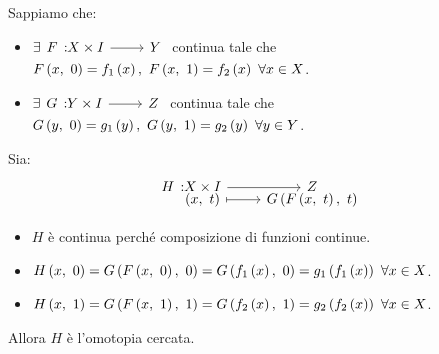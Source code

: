 \begin{demonstration}
	Sappiamo che:
	\begin{itemize}
		\item $\exists \funz{F}{X\times I}{Y}$ continua tale che $\mvf{F}{x}{0}=f_1\left(x\right),\ \mvf{F}{x}{1}=f_2\left(x\right)\ \forall x\in X$.
		\item $\exists \funz{G}{Y\times I}{Z}$ continua tale che $\mvf{G}{y}{0}=g_1\left(y\right),\ \mvf{G}{y}{1}=g_2\left(y\right)\ \forall y\in Y$.
	\end{itemize}
Sia:
\begin{equation*}
	\funztot{H}{X\times I}{Z}{\left(x,\ t\right)}{\mvf{G}{\mvf{F}{x}{t}}{t}}
\end{equation*}
\begin{itemize}
	\item $H$ è continua perché composizione di funzioni continue.
	\item $\mvf{H}{x}{0}=\mvf{G}{\mvf{F}{x}{0}}{0}=\mvf{G}{f_1\left(x\right)}{0}=g_1\left(f_1\left(x\right)\right)\ \forall x\in X$.
	\item $\mvf{H}{x}{1}=\mvf{G}{\mvf{F}{x}{1}}{1}=\mvf{G}{f_2\left(x\right)}{1}=g_2\left(f_2\left(x\right)\right)\ \forall x\in X$.
\end{itemize}
Allora $H$ è l'omotopia cercata.
\end{demonstration}
